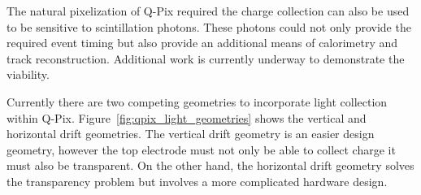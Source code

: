 The natural pixelization of Q-Pix required the charge collection can also be used to be sensitive to scintillation photons.
These photons could not only provide the required event timing but also provide an additional means of calorimetry and track reconstruction.
Additional work is currently underway to demonstrate the viability.

Currently there are two competing geometries to incorporate light collection within Q-Pix.
Figure~\ref{fig:qpix_light_geometries} shows the vertical and horizontal drift geometries.
The vertical drift geometry is an easier design geometry, however the top electrode must not only be able to collect charge it must also be transparent. 
On the other hand, the horizontal drift geometry solves the transparency problem but involves a more complicated hardware design. 

